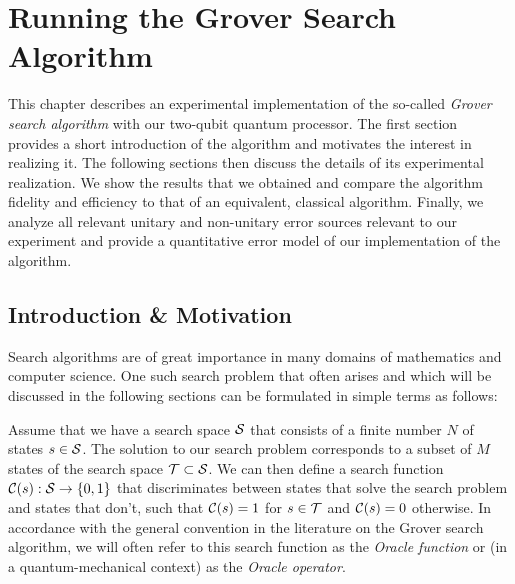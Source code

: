 
\chapter{Running the Grover Search Algorithm} \label{chapter:grover_algorithm}

This chapter describes an experimental implementation of the so-called {\it Grover search algorithm} with our two-qubit quantum processor. The first section provides a short introduction of the algorithm and motivates the interest in realizing it. The following sections then discuss the details of its experimental realization. We show the results that we obtained and compare the algorithm fidelity and efficiency to that of an equivalent, classical algorithm. Finally, we analyze all relevant unitary and non-unitary error sources relevant to our experiment and provide a quantitative error model of our implementation of the algorithm.

\section{Introduction \& Motivation}

Search algorithms are of great importance in many domains of mathematics and computer science. One such search problem that often arises and which will be discussed in the following sections can be formulated in simple terms as follows:

\smallskip

Assume that we have a search space $\begin{mathcal}S\end{mathcal}$ that consists of a finite number $N$ of states $s \in \begin{mathcal}S\end{mathcal}$. The solution to our search problem corresponds to a subset of $M$ states of the search space $\begin{mathcal}T\end{mathcal} \subset \begin{mathcal}S\end{mathcal}$. We can then define a search function $\Or(s):\begin{mathcal}S\end{mathcal}\to \{0,1\}$ that discriminates between states that solve the search problem and states that don't, such that $\Or(s) = 1$ for $s \in \begin{mathcal}T\end{mathcal}$ and $\Or(s) = 0$ otherwise. In accordance with the general convention in the literature on the Grover search algorithm, we will  often refer to this search function as the {\it Oracle function} or (in a quantum-mechanical context) as the {\it Oracle operator}.

